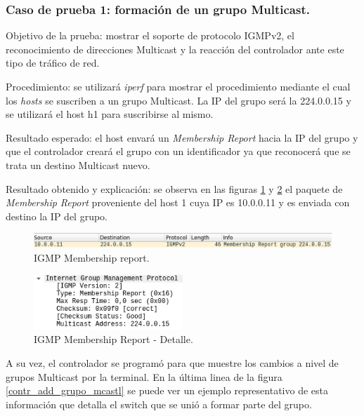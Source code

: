 \documentclass[12pt,a4paper,oneside]{book}
\begin{document}
\subsubsection{Caso de prueba 1: formación de un grupo Multicast.} 
\label{primercaso}

Objetivo de la prueba: mostrar el soporte de protocolo IGMPv2, el reconocimiento de direcciones Multicast y la reacción del controlador ante este tipo de tráfico de red.

\vspace{0.5cm}
Procedimiento: se utilizará \textit{iperf} para mostrar el procedimiento mediante el cual los \textit{hosts} se suscriben a un grupo Multicast. La IP del grupo será la 224.0.0.15 y se utilizará el host h1 para suscribirse al mismo.

\vspace{0.5cm}
Resultado esperado: el host envará un \textit{Membership Report} hacia la IP del grupo y que el controlador creará el grupo con un identificador ya que reconocerá que se trata un destino Multicast nuevo.

\vspace{0.5cm}
Resultado obtenido y explicación: se observa en las figuras \ref{igmp_mr_h1} y \ref{igmp_mr_h1_detail} el paquete de \textit{Membership Report} proveniente del host 1 cuya IP es 10.0.0.11 y es enviada con destino la IP del grupo.

\begin{figure}[ht]
 \centering
 \includegraphics[width=1\textwidth]{fotos/5_Pruebas/1_topo_lineales/Casos/1/wire_igmp_de_host1.png}
 \caption{IGMP Membership report.}
 \label{igmp_mr_h1}
\end{figure}

\begin{figure}[ht]
 \centering
 \includegraphics[width=0.5\textwidth]{fotos/5_Pruebas/1_topo_lineales/Casos/1/wire_igmp_detail.png}
 \caption{IGMP Membership Report - Detalle.}
 \label{igmp_mr_h1_detail}
\end{figure}

A su vez, el controlador se programó para que muestre los cambios a nivel de grupos Multicast por la terminal. En la última linea de la figura \ref{contr_add_grupo_mcastl} se puede ver un ejemplo representativo de esta información que detalla el switch que se unió a formar parte del grupo.
\end{document}
